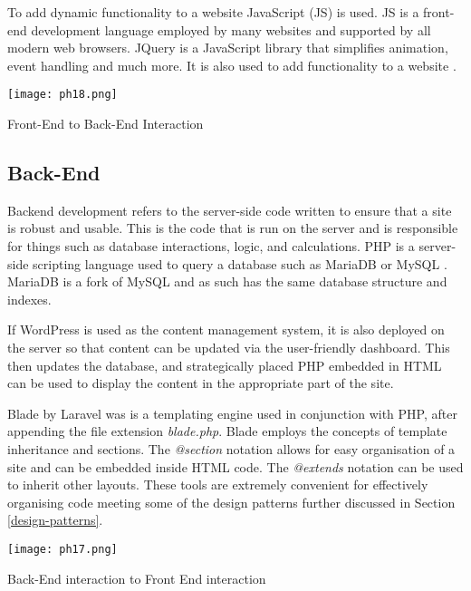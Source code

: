 \documentclass[fontsize=11pt]{extarticle}
\numberwithin{figure}{section} %
\numberwithin{table}{section}%
\begin{document}
To add dynamic functionality to a website JavaScript (JS) is used. JS is
a front-end development language employed by many websites and supported
by all modern web browsers. JQuery is a JavaScript library that
simplifies animation, event handling and much more. It is also used to
add functionality to a website \cite{p16}.

\begin{table}[H]
      \centering
      \texttt{[image: ph18.png]}
      \caption{Front-End to Back-End Interaction}
 \end{table}

\hypertarget{back-end}{%
\subsection{Back-End}\label{back-end}}

Backend development refers to the server-side code written to ensure
that a site is robust and usable. This is the code that is run on the
server and is responsible for things such as database interactions,
logic, and calculations. PHP is a server-side scripting language used to
query a database such as MariaDB or MySQL \cite{p17}. MariaDB is a fork
of MySQL and as such has the same database structure and indexes.
\cite{p24}

If WordPress is used as the content management system, it is also
deployed on the server so that content can be updated via the
user-friendly dashboard. This then updates the database, and
strategically placed PHP embedded in HTML can be used to display the
content in the appropriate part of the site.

Blade by Laravel was is a templating engine used in conjunction with
PHP, after appending the file extension \emph{blade.php}. Blade employs
the concepts of template inheritance and sections. The \emph{@section}
notation allows for easy organisation of a site and can be embedded
inside HTML code. The \emph{@extends} notation can be used to inherit
other layouts. These tools are extremely convenient for effectively
organising code \cite{p18} meeting some of the design patterns further
discussed in Section \ref{design-patterns}.

\begin{table}[H]
      \centering
      \texttt{[image: ph17.png]}
      \caption{Back-End interaction to Front End interaction}
 \end{table}
\end{document}

